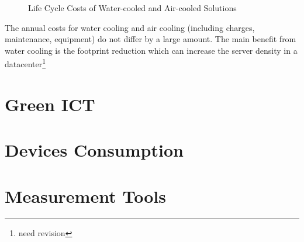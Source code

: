                 \begin{figure}[h!tb]
                    \centering
                    \caption{Life Cycle Costs of Water-cooled and Air-cooled Solutions}
                    \label{fig:life_cycle_costs_water_cooled_air_cooled}
                \end{figure}
                The annual costs for water cooling and air cooling (including charges, maintenance, equipment) do not differ by a large amount. The main benefit from water cooling is the footprint reduction which can increase the server density in a datacenter\footnote{need revision}%

\pagebreak
\section{Green ICT} \label{sec2:green_ict}
\section{Devices Consumption} \label{sec2:devices_consumption} 
\section{Measurement Tools} \label{sec2:tools}


